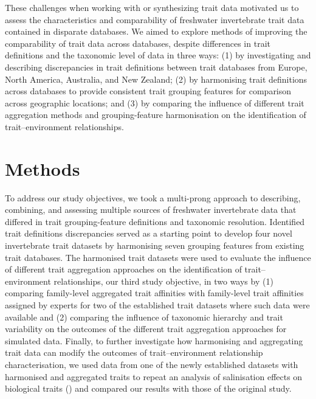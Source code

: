 \documentclass{article}
\begin{document}
These challenges when working with or synthesizing trait data motivated us to assess the characteristics and comparability of freshwater invertebrate trait data contained in disparate databases. We aimed to explore methods of improving the comparability of trait data across databases, despite differences in trait definitions and the taxonomic level of data in three ways: (1) by investigating and describing discrepancies in trait definitions between trait databases from Europe, North America, Australia, and New Zealand; (2) by harmonising trait definitions across databases to provide consistent trait grouping features for comparison across geographic locations; and (3) by comparing the influence of different trait aggregation methods and grouping-feature harmonisation on the identification of trait–environment relationships.



\newpage

\section*{Methods}

To address our study objectives, we took a multi-prong approach to describing, combining, and assessing multiple sources of freshwater invertebrate data that differed in trait grouping-feature definitions and taxonomic resolution. 
Identified trait definitions discrepancies served as a starting point to develop four novel invertebrate trait datasets by harmonising seven grouping features from existing trait databases. The harmonised trait datasets were used to evaluate the influence of different trait aggregation approaches on the identification of trait–environment relationships, our third study objective, in two ways by (1) comparing family-level aggregated trait affinities with family-level trait affinities assigned by experts for two of the established trait datasets where such data were available and (2) comparing the influence of taxonomic hierarchy and trait variability on the outcomes of the different trait aggregation approaches for simulated data. Finally, to further investigate how harmonising and aggregating trait data can modify the outcomes of trait–environment relationship characterisation, we used data from one of the newly established datasets with harmonised and aggregated traits to repeat an analysis of salinisation effects on biological traits (\cite{szocs_effects_2014}) and compared our results with those of the original study.
\end{document}
